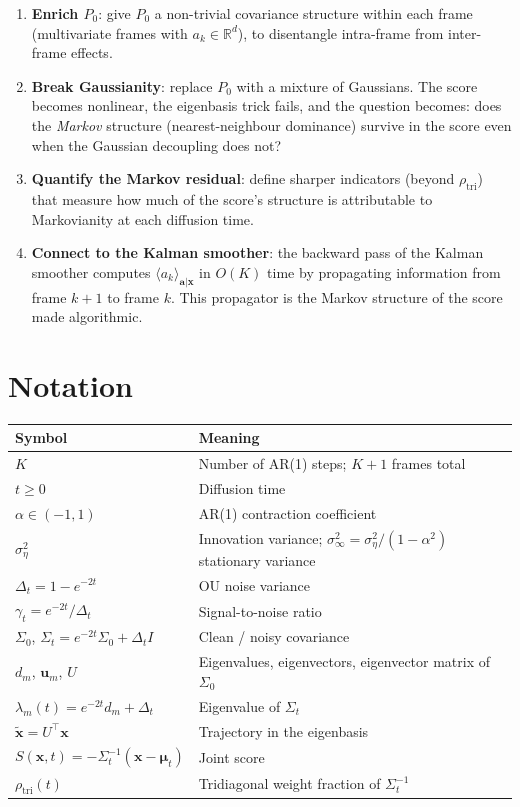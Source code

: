 \documentclass[11pt,a4paper]{article}
\theoremstyle{definition}
\newcommand{\R}{\mathbb{R}}
\newcommand{\Dt}{\Delta_t}
\newcommand{\se}{\sigma_\eta^2}
\newcommand{\sinf}{\sigma_\infty^2}
\begin{document}
\begin{enumerate}[label=\arabic*., nosep, leftmargin=2em]
  \item \textbf{Enrich $P_0$}: give $P_0$ a non-trivial covariance structure within each frame (multivariate frames with $a_k \in \R^d$), to disentangle intra-frame from inter-frame effects.
  \item \textbf{Break Gaussianity}: replace $P_0$ with a mixture of Gaussians.  The score becomes nonlinear, the eigenbasis trick fails, and the question becomes: does the \emph{Markov} structure (nearest-neighbour dominance) survive in the score even when the Gaussian decoupling does not?
  \item \textbf{Quantify the Markov residual}: define sharper indicators (beyond $\rho_{\mathrm{tri}}$) that measure how much of the score's structure is attributable to Markovianity at each diffusion time.
  \item \textbf{Connect to the Kalman smoother}: the backward pass of the Kalman smoother computes $\langle a_k \rangle_{\mathbf{a}|\mathbf{x}}$ in $O(K)$ time by propagating information from frame $k+1$ to frame $k$.  This propagator is the Markov structure of the score made algorithmic.
\end{enumerate}


\section{Notation}
\label{sec:notation}

\begin{center}
\small
\begin{tabular}{@{}ll@{}}
\toprule
\textbf{Symbol} & \textbf{Meaning} \\
\midrule
$K$ & Number of AR(1) steps; $K+1$ frames total \\
$t \geq 0$ & Diffusion time \\
$\alpha \in (-1,1)$ & AR(1) contraction coefficient \\
$\se$ & Innovation variance; $\sinf = \se/(1-\alpha^2)$ stationary variance \\
$\Dt = 1 - e^{-2t}$ & OU noise variance \\
$\gamma_t = e^{-2t}/\Dt$ & Signal-to-noise ratio \\
$\Sigma_0$, $\Sigma_t = e^{-2t}\Sigma_0 + \Dt I$ & Clean / noisy covariance \\
$d_m$, $\mathbf{u}_m$, $U$ & Eigenvalues, eigenvectors, eigenvector matrix of $\Sigma_0$ \\
$\lambda_m(t) = e^{-2t}d_m + \Dt$ & Eigenvalue of $\Sigma_t$ \\
$\tilde{\mathbf{x}} = U^\top\mathbf{x}$ & Trajectory in the eigenbasis \\
$S(\mathbf{x},t) = -\Sigma_t^{-1}(\mathbf{x}-\bm{\mu}_t)$ & Joint score \\
$\rho_{\mathrm{tri}}(t)$ & Tridiagonal weight fraction of $\Sigma_t^{-1}$ \\
\bottomrule
\end{tabular}
\end{center}
\end{document}
